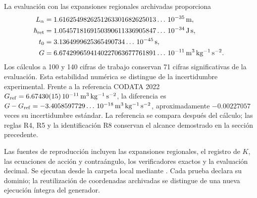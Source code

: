 La evaluación con las expansiones regionales archivadas proporciona
\begin{align*}
 L_\alpha&=1.6162549826251263301682625013\ldots\,10^{-35}\,\mathrm m,\\
 \hbar_{\rm ret}&=1.0545718169150390611336905847\ldots\,10^{-34}\,
                    \mathrm{J\,s},\\
 t_0&=3.1364999625365490734\ldots\,10^{-45}\,\mathrm s,\\
 G&=6.6742996594140227063677761891\ldots\,10^{-11}\,
                    \mathrm{m^3\,kg^{-1}\,s^{-2}}.
\end{align*}
Los cálculos a 100 y 140 cifras de trabajo conservan 71 cifras
significativas de la evaluación. Esta estabilidad numérica se distingue
de la incertidumbre experimental. Frente a la referencia CODATA 2022
\(G_{\rm ref}=6.67430(15)\,10^{-11}\,\mathrm{m^3\,kg^{-1}\,s^{-2}}\),
la diferencia es
\(G-G_{\rm ref}=-3.4058597729\ldots\,10^{-18}\,
\mathrm{m^3\,kg^{-1}\,s^{-2}}\), aproximadamente
\(-0.00227057\) veces su incertidumbre estándar. La referencia se
compara después del cálculo; las reglas R4, R5 y la identificación R8
conservan el alcance demostrado en la sección precedente.

Las fuentes de reproducción incluyen las expansiones regionales, el
registro de \(K\), las ecuaciones de acción y contraángulo, los
verificadores exactos y la evaluación decimal. Se ejecutan desde la
carpeta local  mediante
. Cada prueba declara su dominio; la
reutilización de coordenadas archivadas se distingue de una nueva
ejecución íntegra del generador.
